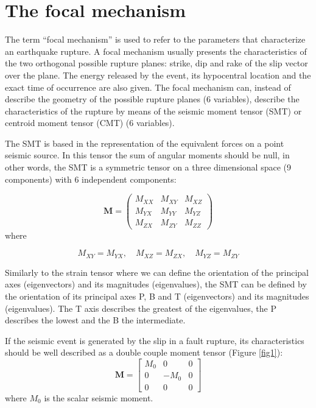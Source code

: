 \documentclass[11pt,a4paper,english]{article}
\numberwithin{equation}{section}
\begin{document}
\section{The focal mechanism}

The term ``focal mechanism'' is used to refer to the parameters
that characterize an earthquake rupture. A focal mechanism usually
presents the characteristics of the two orthogonal possible rupture
planes: strike, dip and rake of the slip vector over the plane. The
energy released by the event, its hypocentral location and the exact
time of occurrence are also given. The focal mechanism can, instead
of describe the geometry of the possible rupture planes (6 variables),
describe the characteristics of the rupture by means of the seismic
moment tensor (SMT) or centroid moment tensor (CMT) (6 variables).

The SMT is based in the representation of the equivalent forces on
a point seismic source. In this tensor the sum of angular moments
should be null, in other words, the SMT is a symmetric tensor on a
three dimensional space (9 components) with 6 independent components:

\begin{equation}
\mathbf{M}=\begin{pmatrix}M_{XX} & M_{XY} & M_{XZ}\\
M_{YX} & M_{YY} & M_{YZ}\\
M_{ZX} & M_{ZY} & M_{ZZ}
\end{pmatrix}
\end{equation}
where

\begin{equation}
M_{XY}=M_{YX},\quad M_{XZ}=M_{ZX},\quad M_{YZ}=M_{ZY}
\end{equation}

Similarly to the strain tensor where we can define the orientation
of the principal axes (eigenvectors) and its magnitudes (eigenvalues),
the SMT can be defined by the orientation of its principal axes P,
B and T (eigenvectors) and its magnitudes (eigenvalues). The T axis
describes the greatest of the eigenvalues, the P describes the lowest
and the B the intermediate.

If the seismic event is generated by the slip in a fault rupture,
its characteristics should be well described as a double couple moment
tensor (Figure \ref{fig1}): 
\begin{equation}
\mathbf{M}=\begin{bmatrix}M_{0} & 0 & 0\\
0 & -M_{0} & 0\\
0 & 0 & 0
\end{bmatrix}
\end{equation}
where $M_{0}$ is the scalar seismic moment.
\end{document}
